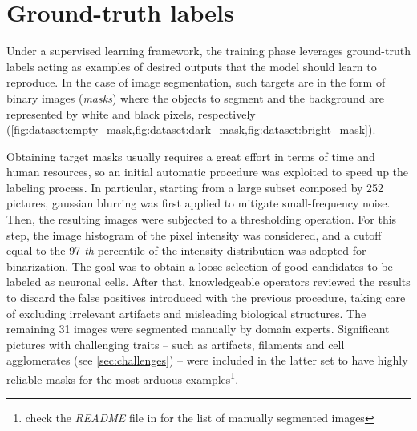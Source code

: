 \section{Ground-truth labels}
Under a supervised learning framework, the training phase leverages ground-truth labels acting as examples of desired outputs that the model should learn to reproduce. 
In the case of image segmentation, such targets are in the form of binary images (\textit{masks}) where the objects to segment and the background are represented by white and black pixels, respectively 
(\cref{fig:dataset:empty_mask,fig:dataset:dark_mask,fig:dataset:bright_mask}).

Obtaining target masks usually requires a great effort in terms of time and human resources, so an initial automatic procedure was exploited to speed up the labeling process. 
In particular, starting from a large subset composed by 252 pictures, gaussian blurring was first applied to mitigate small-frequency noise. 
Then, the resulting images were subjected to a thresholding operation.
For this step, the image histogram of the pixel intensity was considered, and a cutoff equal to the 97\emph{-th} percentile of the intensity distribution was adopted for binarization. 
The goal was to obtain a loose selection of good candidates to be labeled as neuronal cells. 
After that, knowledgeable operators reviewed the results to discard the false positives introduced with the previous procedure, taking care of excluding irrelevant artifacts and misleading biological structures.
The remaining 31 images were segmented manually by domain experts. Significant pictures with challenging traits -- such as artifacts, filaments and cell agglomerates (see \cref{sec:challenges}) -- were included in the latter set to have highly reliable masks for the most arduous examples\footnote{check the \emph{README} file in  for the list of manually segmented images}. 



